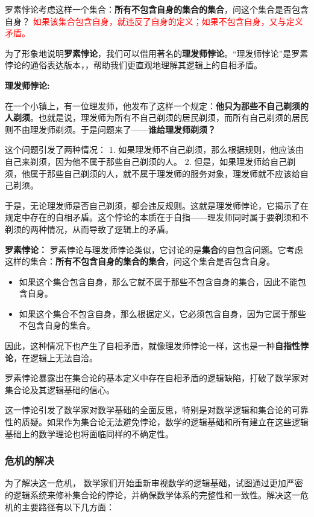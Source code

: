 罗素悖论考虑这样一个集合：{\bf 所有不包含自身的集合的集合}，问这个集合是否包含自身？
\textcolor{red}{如果该集合包含自身，就违反了自身的定义；如果不包含自身，又与定义矛盾。}

为了形象地说明{\bf 罗素悖论}，我们可以借用著名的{\bf 理发师悖论}。“理发师悖论”是罗素悖论的通俗表达版本，，帮助我们更直观地理解其逻辑上的自相矛盾。

{\bf 理发师悖论:}

在一个小镇上，有一位理发师，他发布了这样一个规定：{\bf 他只为那些不自己剃须的人剃须}。也就是说，理发师为所有不自己剃须的居民剃须，而所有自己剃须的居民则不由理发师剃须。于是问题来了——{\bf 谁给理发师剃须？}

这个问题引发了两种情况：
1. 如果理发师不自己剃须，那么根据规则，他应该由自己来剃须，因为他不属于那些自己剃须的人。
2. 但是，如果理发师给自己剃须，他属于那些自己剃须的人，就不属于理发师的服务对象，理发师就不应该给自己剃须。

于是，无论理发师是否自己剃须，都会违反规则。这就是理发师悖论，它揭示了在规定中存在的自相矛盾。这个悖论的本质在于自指——理发师同时属于要剃须和不剃须的两种情况，从而导致了逻辑上的矛盾。

{\bf 罗素悖论：}
罗素悖论与理发师悖论类似，它讨论的是{\bf 集合}的自包含问题。它考虑这样的集合：{\bf 所有不包含自身的集合的集合}，问这个集合是否包含自身。
\begin{itemize}
\item  如果这个集合包含自身，那么它就不属于那些不包含自身的集合，因此不能包含自身。
\item 如果这个集合不包含自身，那么根据定义，它必须包含自身，因为它属于那些不包含自身的集合。
\end{itemize}

因此，这种情况下也产生了自相矛盾，就像理发师悖论一样，这也是一种{\bf 自指性悖论}，在逻辑上无法自洽。

罗素悖论暴露出在集合论的基本定义中存在自相矛盾的逻辑缺陷，打破了数学家对集合论及其逻辑基础的信心。

这一悖论引发了数学家对数学基础的全面反思，特别是对数学逻辑和集合论的可靠性的质疑。如果作为集合论无法避免悖论，数学的逻辑基础和所有建立在这些逻辑基础上的数学理论也将面临同样的不确定性。

\subsubsection{危机的解决}

为了解决这一危机，
数学家们开始重新审视数学的逻辑基础，试图通过更加严密的逻辑系统来修补集合论的悖论，并确保数学体系的完整性和一致性。解决这一危机的主要路径有以下几方面：

